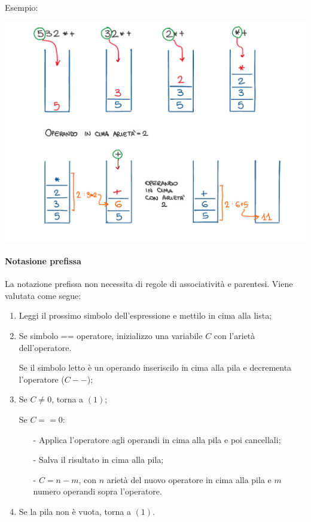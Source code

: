 \documentclass[a4paper, 10pt]{report}
\begin{document}
\noindent Esempio:
\begin{center}
\includegraphics[scale=0.65]{esempio1.pdf}
\end{center}

\paragraph*{Notasione prefissa} La notazione prefissa non necessita di regole di associatività e parentesi. Viene valutata come segue:
\begin{enumerate}
\item Leggi il prossimo simbolo dell'espressione e mettilo in cima alla lista;
\item Se simbolo == operatore, inizializzo una variabile $C$ con l'arietà dell'operatore.
	
Se il simbolo letto è un operando inseriscilo in cima alla pila e decrementa l'operatore ($C--$);
\item Se $C \ne 0$, torna a $(1)$;

Se $C == 0$:
	\begin{itemize}
	\item[-] Applica l'operatore agli operandi in cima alla pila e poi cancellali;
	\item[-] Salva il risultato in cima alla pila;
	\item[-] $C = n - m$, con $n$ arietà del nuovo operatore in cima alla pila e $m$ numero operandi sopra l'operatore.
	\end{itemize}
\item Se la pila non è vuota, torna a $(1)$.
\end{enumerate}
\end{document}
